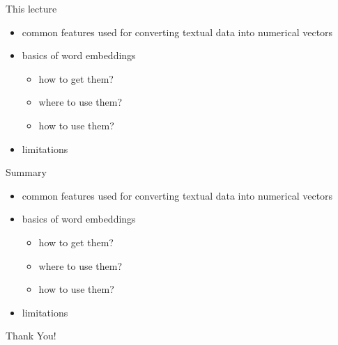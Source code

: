 \begin{frame}
\titlepage
\end{frame}

\begin{frame}{This lecture}
\vspace*{1cm}

\begin{itemize}
        \item common features used for converting textual data into numerical vectors
        \item basics of word embeddings
            \begin{itemize}
                \item how to get them? 
                \item where to use them?
                \item how to use them?
            \end{itemize}
        \item limitations
\end{itemize}
\end{frame}




\begin{frame}{Summary}
    \begin{itemize}
        \item common features used for converting textual data into numerical vectors
        \item basics of word embeddings
            \begin{itemize}
                \item how to get them? 
                \item where to use them?
                \item how to use them?
            \end{itemize}
        \item limitations
    \end{itemize}
\end{frame}
\begin{frame}[c]
\centering
\LARGE{Thank You!}
\end{frame}

